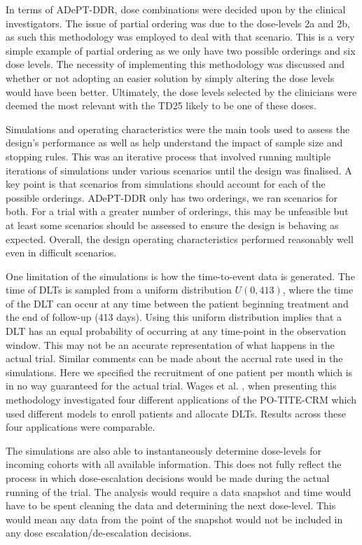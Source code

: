 In terms of ADePT-DDR, dose combinations were decided upon by the clinical investigators. The issue of partial ordering was due to the dose-levels 2a and 2b, as such this methodology was employed to deal with that scenario. This is a very simple example of partial ordering as we only have two possible orderings and six dose levels. The necessity of implementing this methodology was discussed and whether or not adopting an easier solution by simply altering the dose levels would have been better. Ultimately, the dose levels selected by the clinicians were deemed the most relevant with the TD25 likely to be one of these doses.     
 
Simulations and operating characteristics were the main tools used to assess the design's performance as well as help understand the impact of sample size and stopping rules. This was an iterative process that involved running multiple iterations of simulations under various scenarios until the design was finalised. A key point is that scenarios from simulations should account for each of the possible orderings. ADePT-DDR only has two orderings, we ran scenarios for both. For a trial with a greater number of orderings, this may be unfeasible but at least some scenarios should be assessed to ensure the design is behaving as expected. Overall, the design operating characteristics performed reasonably well even in difficult scenarios. 

One limitation of the simulations is how the time-to-event data is generated. The time of DLTs is sampled from a uniform distribution $U(0, 413)$, where the time of the DLT can occur at any time between the patient beginning treatment and the end of follow-up (413 days). Using this uniform distribution implies that a DLT has an equal probability of occurring at any time-point in the observation window. This may not be an accurate representation of what happens in the actual trial. Similar comments can be made about the accrual rate used in the simulations. Here we specified the recruitment of one patient per month which is in no way guaranteed for the actual trial. Wages et al. \cite{wagesUsingTimetoeventContinual2013}, when presenting this methodology investigated four different applications of the PO-TITE-CRM which used different models to enroll patients and allocate DLTs. Results across these four applications were comparable. 

The simulations are also able to instantaneously determine dose-levels for incoming cohorts with all available information. This does not fully reflect the process in which dose-escalation decisions would be made during the actual running of the trial. The analysis would require a data snapshot and time would have to be spent cleaning the data and determining the next dose-level. This would mean any data from the point of the snapshot would not be included in any dose escalation/de-escalation decisions. 

